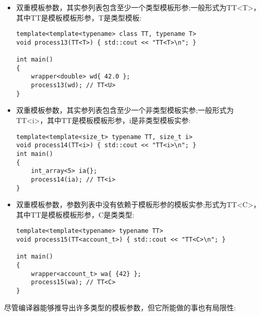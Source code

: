 \begin{itemize}
\begin{lstlisting}[style=styleCXX]
template <size_t i>
struct int_array
{
	int data[i];
};

template<size_t i>
void process12(int_array<i>) { std::cout << "C<i>\n"; }

int main()
{
	int_array<5> ia{};
	process12(ia); // C<i>
}
\end{lstlisting}

\item
双重模板参数，其实参列表包含至少一个类型模板形参;一般形式为TT<T>，其中TT是模板模板形参，T是类型模板:

\begin{lstlisting}[style=styleCXX]
template<template<typename> class TT, typename T>
void process13(TT<T>) { std::cout << "TT<T>\n"; }

int main()
{
	wrapper<double> wd{ 42.0 };
	process13(wd); // TT<U>
}
\end{lstlisting}

\item
双重模板参数，其实参列表包含至少一个非类型模板实参;一般形式为TT<i>，其中TT是模板模板形参，i是非类型模板实参:

\begin{lstlisting}[style=styleCXX]
template<template<size_t> typename TT, size_t i>
void process14(TT<i>) { std::cout << "TT<i>\n"; }
int main()
{
	int_array<5> ia{};
	process14(ia); // TT<i>
}
\end{lstlisting}

\item
双重模板参数，参数列表中没有依赖于模板形参的模板实参;形式为TT<C>，其中TT是模板模板形参，C是类类型:

\begin{lstlisting}[style=styleCXX]
template<template<typename> typename TT>
void process15(TT<account_t>) { std::cout << "TT<C>\n"; }

int main()
{
	wrapper<account_t> wa{ {42} };
	process15(wa); // TT<C>
}
\end{lstlisting}
\end{itemize}

尽管编译器能够推导出许多类型的模板参数，但它所能做的事也有局限性:

